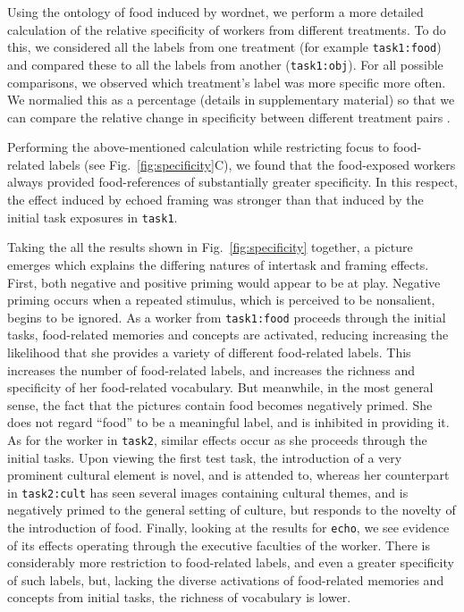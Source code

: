 \documentclass[12pt]{article}
\begin{document}
Using the ontology of food induced by wordnet, we perform a more detailed
calculation of the relative specificity of workers from different treatments.
To do this, we considered all the labels from one treatment
(for example \texttt{task1:food}) and compared these to all the labels from 
another (\texttt{task1:obj}).  For all possible comparisons, we observed 
which treatment's label was more specific more often.  We normalied this
as a percentage (details in supplementary material) so that we can compare the
relative change in specificity between different treatment pairs  .


Performing the above-mentioned calculation while restricting focus to 
food-related labels (see Fig.~\ref{fig:specificity}C), we found that 
the food-exposed workers always provided food-references of substantially 
greater specificity.  In this respect, the effect induced by 
echoed framing was stronger than that induced by the initial task exposures in
\texttt{task1}.

Taking the all the results shown in Fig.~\ref{fig:specificity} together,
a picture emerges which explains the differing natures of intertask and framing
effects.  First, both negative and positive priming would appear to be at play.
Negative priming occurs when a repeated stimulus, which is perceived to be
nonsalient, begins to be ignored.  As a worker from \texttt{task1:food}
proceeds through the initial tasks, food-related memories and concepts are
activated, reducing increasing the likelihood that she provides a variety of
different food-related labels.  This increases the number of food-related
labels, and increases the richness and specificity of her food-related 
vocabulary.  But meanwhile, in the most general sense, the fact that the 
pictures contain food becomes negatively primed.  She does not regard ``food''
to be a meaningful label, and is inhibited in providing it.   
As for the worker in \texttt{task2}, similar effects occur as she proceeds
through the initial tasks.  Upon viewing the first test task, the introduction
of a very prominent cultural element is novel, and is attended to, whereas
her counterpart in \texttt{task2:cult} has seen several images containing 
cultural themes, and is negatively primed to the general setting of culture,
but responds to the novelty of the introduction of food.  Finally, looking at
the results for \texttt{echo}, we see evidence of its effects operating through
the executive faculties of the worker.  There is considerably more
restriction to food-related labels, and even a greater specificity of such 
labels, but, lacking the diverse activations of food-related memories and 
concepts from initial tasks, the richness of vocabulary is lower.
\end{document}
